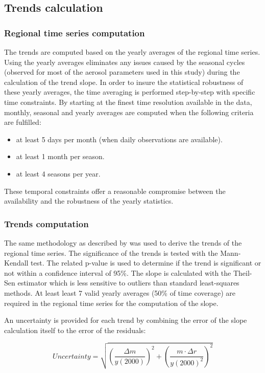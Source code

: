 \documentclass[journal abbreviation, manuscript]{copernicus}
\begin{document}
\subsection{Trends calculation}

\subsubsection{Regional time series computation}
The trends are computed based on the yearly averages of the regional time series. Using the yearly averages eliminates any issues caused by the seasonal cycles (observed for most of the aerosol parameters used in this study) during the calculation of the trend slope. In order to insure the statistical robustness of these yearly averages, the time averaging is performed step-by-step with specific time constraints. By starting at the finest time resolution available in the data, monthly, seasonal and yearly averages are computed when the following criteria are fulfilled:
\begin{itemize}
 \item at least 5 days per month (when daily observations are available).
 \item at least 1 month per season.
 \item at least 4 seasons per year.
\end{itemize}
These temporal constraints offer a reasonable compromise between the availability and the robustness of the yearly statistics.

\subsubsection{Trends computation}
The same methodology as described by \cite{aas2019global} was used to derive the trends of the regional time series. The significance of the trends is tested with the Mann-Kendall test. The related p-value is used to determine if the trend is significant or not within a confidence interval of 95\%. The slope is calculated with the Theil-Sen estimator which is less sensitive to outliers than standard least-squares methods. At least least 7 valid yearly averages (50\% of time coverage) are required in the regional time series for the computation of the slope.

An uncertainty is provided for each trend by combining the error of the slope calculation itself to the error of the residuals:

\begin{equation}
 Uncertainty = \sqrt{{\left (\frac{\Delta m}{y(2000)}\right )}^{2} + {\left ( \frac{m \cdot \Delta r}{y(2000)^2}\right )}^{2} }
\end{equation}
\end{document}

